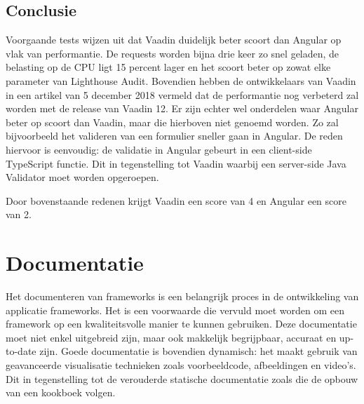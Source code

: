 \subsection{Conclusie}
Voorgaande tests wijzen uit dat Vaadin duidelijk beter scoort dan Angular op vlak van performantie. De requests worden bijna drie keer zo snel geladen, de belasting op de CPU ligt 15 percent lager en het scoort beter op zowat elke parameter van Lighthouse Audit. Bovendien hebben de ontwikkelaars van Vaadin in een artikel van 5 december 2018 \autocite{vaadin122018} vermeld dat de performantie nog verbeterd zal worden met de release van Vaadin 12. 
Er zijn echter wel onderdelen waar Angular beter op scoort dan Vaadin, maar die hierboven niet genoemd worden. Zo zal bijvoorbeeld het valideren van een formulier sneller gaan in Angular. De reden hiervoor is eenvoudig: de validatie in Angular gebeurt in een client-side TypeScript functie. Dit in tegenstelling tot Vaadin waarbij een server-side Java Validator moet worden opgeroepen.

Door bovenstaande redenen krijgt Vaadin een score van 4 en Angular een score van 2. 

\section{Documentatie}
Het documenteren van frameworks is een belangrijk proces in de ontwikkeling van applicatie frameworks. Het is een voorwaarde die vervuld moet worden om een framework op een kwaliteitsvolle manier te kunnen gebruiken. Deze documentatie moet niet enkel uitgebreid zijn, maar ook makkelijk begrijpbaar, accuraat en up-to-date zijn. Goede documentatie is bovendien dynamisch: het maakt gebruik van geavanceerde visualisatie technieken zoals voorbeeldcode, afbeeldingen en video's. Dit in tegenstelling tot de verouderde statische documentatie zoals die de opbouw van een kookboek volgen. 

